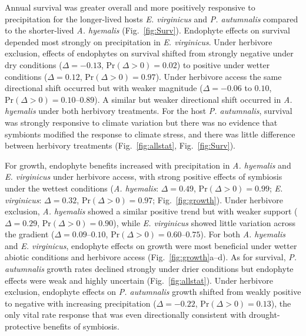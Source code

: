 \documentclass[12pt]{article}\usepackage[]{graphicx}\usepackage[dvipsnames]{xcolor}
\begin{document}
Annual survival was greater overall and more positively responsive to precipitation for the longer-lived hosts \textit{E. virginicus} and \textit{P. autumnalis} compared to the shorter-lived \textit{A. hyemalis} (Fig.~\ref{fig:Surv}).
Endophyte effects on survival depended most strongly on precipitation in \textit{E. virginicus}. 
Under herbivore exclusion, effects of endophytes on survival shifted from strongly negative under dry conditions ($\Delta = -0.13$, $\mathrm{Pr}(\Delta > 0) = 0.02$) to positive under wetter conditions ($\Delta = 0.12$, $\mathrm{Pr}(\Delta > 0) = 0.97$). 
Under herbivore access the same directional shift occurred but with weaker magnitude ($\Delta = -0.06$ to $0.10$, $\mathrm{Pr}(\Delta > 0) = 0.10$--$0.89$). 
A similar but weaker directional shift occurred in \textit{A. hyemalis} under both herbivory treatments.
For the host \textit{P. autumnalis}, survival was strongly responsive to climate variation but there was no evidence that symbionts modified the response to climate stress, and there was little difference between herbivory treatments (Fig.~\ref{fig:allstat}, Fig.~\ref{fig:Surv}).

For growth, endophyte benefits increased with precipitation in \textit{A. hyemalis} and \textit{E. virginicus} under herbivore access, with strong positive effects of symbiosis under the wettest conditions (\textit{A. hyemalis}: $\Delta = 0.49$, $\mathrm{Pr}(\Delta > 0) = 0.99$; \textit{E. virginicus}: $\Delta = 0.32$, $\mathrm{Pr}(\Delta > 0) = 0.97$; Fig.~\ref{fig:growth}). 
Under herbivore exclusion, \textit{A. hyemalis} showed a similar positive trend but with weaker support ($\Delta = 0.29$, $\mathrm{Pr}(\Delta > 0) = 0.90$), while \textit{E. virginicus} showed little variation across the gradient ($\Delta = 0.09$--$0.10$, $\mathrm{Pr}(\Delta > 0) = 0.60$--$0.75$). 
For both \textit{A. hyemalis} and \textit{E. virginicus}, endophyte effects on growth were most beneficial under wetter abiotic conditions and herbivore access (Fig.~\ref{fig:growth}a--d). 
As for survival, \textit{P. autumnalis} growth rates declined strongly under drier conditions but endophyte effects were weak and highly uncertain (Fig.~\ref{fig:allstat}). 
Under herbivore exclusion, endophyte effects on \textit{P. autumnalis} growth shifted from weakly positive to negative with increasing precipitation ($\Delta = -0.22$, $\mathrm{Pr}(\Delta > 0) = 0.13$), the only vital rate response that was even directionally consistent with drought-protective benefits of symbiosis.
\end{document}
